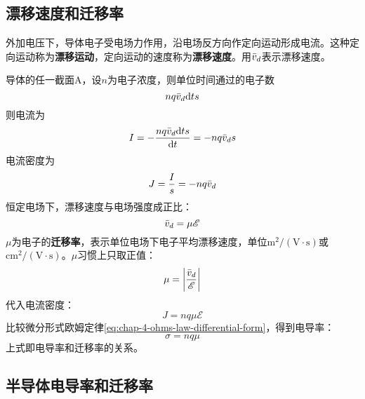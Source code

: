 \subsection{漂移速度和迁移率}

外加电压下，导体电子受电场力作用，沿电场反方向作定向运动形成电流。这种定向运动称为\textbf{漂移运动}，定向运动的速度称为\textbf{漂移速度}。用$\Bar{v}_d$表示漂移速度。

导体的任一截面A，设$n$为电子浓度，则单位时间通过的电子数
\begin{equation*}
    nq\Bar{v}_d\mathrm{d}ts
\end{equation*}
则电流为
\begin{equation}
    I=-\frac{nq\Bar{v}_d\mathrm{d}ts}{\mathrm{d}t}=-nq\Bar{v}_ds
\end{equation}
电流密度为
\begin{equation}
    J=\frac{I}{s}=-nq\Bar{v}_d
\end{equation}
恒定电场下，漂移速度与电场强度成正比：
\begin{equation}
    \Bar{v}_d=\mu\mathscr{E}
\end{equation}
$\mu$为电子的\textbf{迁移率}，表示单位电场下电子平均漂移速度，单位$\mathrm{m^2/(V\cdot s)}$或$\mathrm{cm^2/(V\cdot s)}$。$\mu$习惯上只取正值：
\begin{equation}
    \mu=\left|\frac{\Bar{v}_d}{\mathscr{E}}\right|
\end{equation}
代入电流密度：
\begin{equation}
    J=nq\mu\mathscr{E}
\end{equation}
比较微分形式欧姆定律\autoref{eq:chap-4-ohms-law-differential-form}，得到电导率：
\begin{equation}
    \sigma=nq\mu
\end{equation}
上式即电导率和迁移率的关系。

\subsection{半导体电导率和迁移率}

